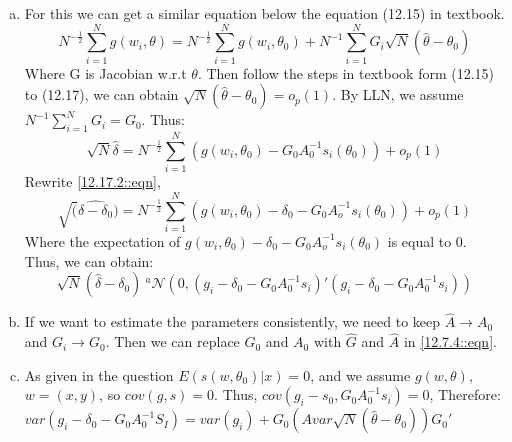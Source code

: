 \documentclass[11pt]{article} %
\begin{document}
\begin{enumerate}[a.]
	\item For this we can get a similar equation below the equation (12.15) in textbook. 
	\begin{equation}\tag*{12.17.1}\label{12.17.1::eqn}
		N^{-\frac{1}{2}}\sum_{i=1}^Ng(w_i,\theta)=N^{-\frac{1}{2}}\sum_{i=1}^Ng(w_i,\theta_0)+N^{-1}\sum_{i=1}^N G_i \sqrt{N}(\hat{\theta}-\theta_0)
	\end{equation}
	Where G is Jacobian w.r.t $\theta$. Then follow the steps in textbook form  (12.15) to (12.17), we can obtain $\sqrt{N}(\hat{\theta}-\theta_0)=o_p(1)$. By LLN, we assume $N^{-1}\sum_{i=1}^N G_i =G_0$. 
	Thus:
	\begin{equation}\tag*{12.17.2}\label{12.17.2::eqn}
		\sqrt{N}\hat{\delta}=N^{-\frac{1}{2}}\sum_{i=1}^N(g(w_i,\theta_0)-G_0A_0^{-1}s_i(\theta_0))+o_p(1)
	\end{equation}
	Rewrite \ref{12.17.2::eqn}, 
	\begin{equation}\tag*{12.17.3}
		\sqrt(\hat{\delta-\delta_0})=N^{-\frac{1}{2}}\sum_{i=1}^N(g(w_i,\theta_0)-\delta_0-G_0A_o^{-1}s_i(\theta_0))+o_p(1)
	\end{equation}
	Where the expectation of $g(w_i,\theta_0)-\delta_0-G_0A_o^{-1}s_i(\theta_0)$ is equal to 0. 
	Thus, we can obtain:
	\begin{equation}\tag*{12.17.4}\label{12.7.4::eqn}
		\sqrt{N}(\hat{\delta}-\delta_0) ~^a \mathcal{N}(0,(g_i-\delta_0-G_0A_0^{-1}s_i)'(g_i-\delta_0-G_0A_0^{-1}s_i))
	\end{equation}
	\item If we want to estimate the parameters consistently, we need to keep $\hat{A}\rightarrow A_0$ and $G_i \rightarrow G_0$. Then we can replace $G_0$ and $A_0$ with $\hat{G}$ and $\hat{A}$ in \ref{12.7.4::eqn}.
	\item As given in the question $E(s(w,\theta_0)|x)=0$, and we assume $g(w,\theta)$, $w=(x,y)$, so $cov(g,s)=0$. Thus, $cov(g_i-s_0,G_0A_0^{-1}s_i)=0$, Therefore:
	$var(g_i-\delta_0-G_0A_0^{-1}S_I)=var(g_i)+G_0(Avar\sqrt{N}(\hat{\theta}-\theta_0))G_0'$
\end{enumerate}
\end{document}
